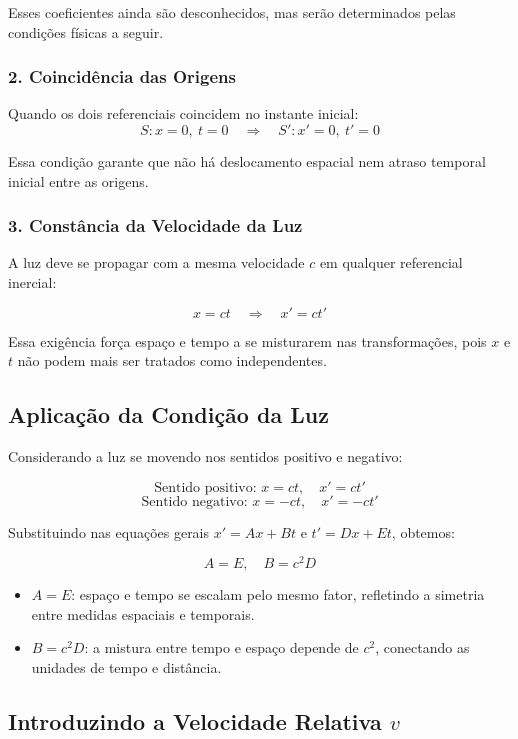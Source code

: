 \documentclass[12pt,a4paper]{article}
\begin{document}
Esses coeficientes ainda são desconhecidos, mas serão determinados pelas condições físicas a seguir.

\subsubsection{2. Coincidência das Origens}

Quando os dois referenciais coincidem no instante inicial:
\[
S: x = 0, \ t = 0 \quad \Rightarrow \quad S': x' = 0, \ t' = 0
\]

Essa condição garante que não há deslocamento espacial nem atraso temporal inicial entre as origens.

\subsubsection{3. Constância da Velocidade da Luz}

A luz deve se propagar com a mesma velocidade $c$ em qualquer referencial inercial:

\[
x = c t \quad \Rightarrow \quad x' = c t'
\]

Essa exigência força espaço e tempo a se misturarem nas transformações, pois $x$ e $t$ não podem mais ser tratados como independentes.

\subsection{Aplicação da Condição da Luz}

Considerando a luz se movendo nos sentidos positivo e negativo:

\[
\text{Sentido positivo: } x = c t, \quad x' = c t' 
\]
\[
\text{Sentido negativo: } x = -c t, \quad x' = -c t'
\]

Substituindo nas equações gerais $x' = A x + B t$ e $t' = D x + E t$, obtemos:

\[
A = E, \quad B = c^2 D
\]

\begin{itemize}
    \item $A = E$: espaço e tempo se escalam pelo mesmo fator, refletindo a simetria entre medidas espaciais e temporais.
    \item $B = c^2 D$: a mistura entre tempo e espaço depende de $c^2$, conectando as unidades de tempo e distância.
\end{itemize}

\subsection{Introduzindo a Velocidade Relativa $v$}
\end{document}

